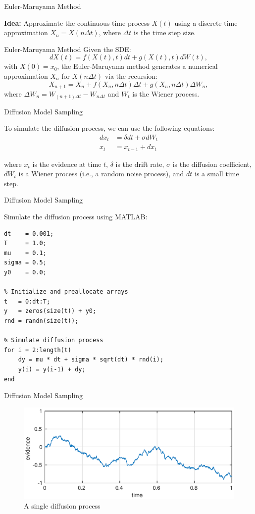\documentclass{beamer}
\begin{document}
\begin{frame}{Euler-Maruyama Method}

\textbf{Idea:} Approximate the continuous-time process $X(t)$ using a discrete-time approximation $X_n = X(n \Delta t)$, where $\Delta t$ is the time step size.

\pause

\begin{block}{Euler-Maruyama Method}
    Given the SDE: 
    $$ dX(t) = f(X(t), t) dt + g(X(t), t) dW(t), $$
    with $X(0) = x_0$, the Euler-Maruyama method generates a numerical approximation $X_n$ for $X(n\Delta t)$ via the recursion: 
    $$ X_{n+1} = X_n + f(X_n, n\Delta t) \Delta t + g(X_n, n\Delta t) \Delta W_n,$$
    where $\Delta W_n = W_{(n+1)\Delta t} - W_{n\Delta t}$ and $W_t$ is the Wiener process.
\end{block}

\end{frame}



\begin{frame}{Diffusion Model Sampling}

To simulate the diffusion process, we can use the following equations:
\begin{align*}
dx_t &= \delta dt + \sigma dW_t \\
x_t &= x_{t-1} + dx_t
\end{align*}

where $x_t$ is the evidence at time $t$, $\delta$ is the drift rate, $\sigma$ is the diffusion coefficient, $dW_t$ is a Wiener process (i.e., a random noise process), and $dt$ is a small time step.

\end{frame}


\begin{frame}[fragile]{Diffusion Model Sampling}

Simulate the diffusion process using MATLAB:

\begin{lstlisting}[style=Matlab]
dt    = 0.001;
T     = 1.0;
mu    = 0.1;
sigma = 0.5;
y0    = 0.0;

% Initialize and preallocate arrays
t   = 0:dt:T;
y   = zeros(size(t)) + y0;
rnd = randn(size(t));

% Simulate diffusion process
for i = 2:length(t)
    dy = mu * dt + sigma * sqrt(dt) * rnd(i);
    y(i) = y(i-1) + dy;
end
\end{lstlisting}


\end{frame}


\begin{frame}[fragile]{Diffusion Model Sampling}
\begin{figure}[htp]
\centering
\includegraphics[scale=0.7]{diff.eps}
\caption{A single diffusion process}
\label{}
\end{figure}
\end{frame}
\end{document}
